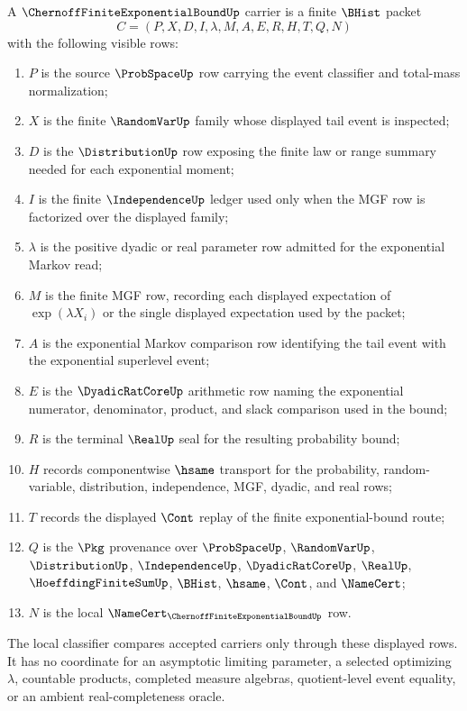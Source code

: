 \begin{definition}
\label{def:chernoff-finite-exponential-bound-carrier}
A $\ChernoffFiniteExponentialBoundUp$ carrier is a finite $\BHist$ packet
$$
C=(P,X,D,I,\lambda,M,A,E,R,H,T,Q,N)
$$
with the following visible rows:
\begin{enumerate}
\item $P$ is the source $\ProbSpaceUp$ row carrying the event classifier and total-mass normalization;
\item $X$ is the finite $\RandomVarUp$ family whose displayed tail event is inspected;
\item $D$ is the $\DistributionUp$ row exposing the finite law or range summary needed for each exponential moment;
\item $I$ is the finite $\IndependenceUp$ ledger used only when the MGF row is factorized over the displayed family;
\item $\lambda$ is the positive dyadic or real parameter row admitted for the exponential Markov read;
\item $M$ is the finite MGF row, recording each displayed expectation of $\exp(\lambda X_i)$ or the single displayed expectation used by the packet;
\item $A$ is the exponential Markov comparison row identifying the tail event with the exponential superlevel event;
\item $E$ is the $\DyadicRatCoreUp$ arithmetic row naming the exponential numerator, denominator, product, and slack comparison used in the bound;
\item $R$ is the terminal $\RealUp$ seal for the resulting probability bound;
\item $H$ records componentwise $\hsame$ transport for the probability, random-variable, distribution, independence, MGF, dyadic, and real rows;
\item $T$ records the displayed $\Cont$ replay of the finite exponential-bound route;
\item $Q$ is the $\Pkg$ provenance over $\ProbSpaceUp$, $\RandomVarUp$, $\DistributionUp$, $\IndependenceUp$, $\DyadicRatCoreUp$, $\RealUp$, $\HoeffdingFiniteSumUp$, $\BHist$, $\hsame$, $\Cont$, and $\NameCert$;
\item $N$ is the local $\NameCert_{\ChernoffFiniteExponentialBoundUp}$ row.
\end{enumerate}
The local classifier compares accepted carriers only through these displayed rows. It has no coordinate for an asymptotic limiting parameter, a selected optimizing $\lambda$, countable products, completed measure algebras, quotient-level event equality, or an ambient real-completeness oracle.
\end{definition}

